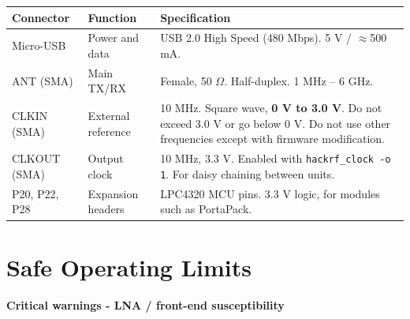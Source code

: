 \documentclass[11pt]{article}
\begin{document}
\begin{table}[h]
    \centering
    \small
    \begin{tabular}{p{}p{}p{}}
        \toprule
        \textbf{Connector} & \textbf{Function} & \textbf{Specification} \\
        \midrule
        Micro-USB   & Power and data        & USB 2.0 High Speed (480 Mbps). 5 V / $\approx$500 mA. \\
        ANT (SMA)   & Main TX/RX            & Female, 50 $\Omega$. Half-duplex. 1 MHz -- 6 GHz. \\
        CLKIN (SMA) & External reference    & 10 MHz. Square wave, \textbf{0 V to 3.0 V}. Do not exceed 3.0 V or go below 0 V. Do not use other frequencies except with firmware modification. \\
        CLKOUT (SMA)& Output clock          & 10 MHz, 3.3 V. Enabled with \texttt{hackrf\_clock -o 1}. For daisy chaining between units. \\
        P20, P22, P28 & Expansion headers    & LPC4320 MCU pins. 3.3 V logic, for modules such as PortaPack. \\
        \bottomrule
    \end{tabular}
\end{table}

\section{Safe Operating Limits}

\begin{warningbox}
\textbf{Critical warnings - LNA / front-end susceptibility}
\end{warningbox}
\end{document}
